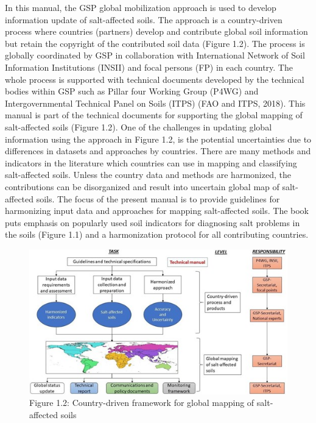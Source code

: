 \documentclass[
  10pt,
  b5paper,
]{book}
\begin{document}
In this manual, the GSP global mobilization approach is used to develop information update of salt-affected soils. The approach is a country-driven process where countries (partners) develop and contribute global soil information but retain the copyright of the contributed soil data (Figure 1.2). The process is globally coordinated by GSP in collaboration with International Network of Soil Information Institutions (INSII) and
focal persons (FP) in each country. The whole process is supported with technical documents developed by the technical bodies within GSP such as Pillar four Working Group (P4WG) and Intergovernmental Technical Panel on Soils (ITPS) (FAO and ITPS, 2018). This manual is part of the technical documents for supporting the global mapping of salt-affected soils (Figure 1.2).
One of the challenges in updating global information using the approach in Figure 1.2, is the potential uncertainties due to differences in datasets and approaches by countries. There are many methods and indicators in the literature which countries can use in mapping and classifying salt-affected soils. Unless the country data and methods are harmonized, the contributions can be disorganized and result into uncertain global map of salt-affected soils. The focus of the present manual is to provide guidelines for harmonizing input data and approaches for mapping salt-affected soils. The book puts emphasis on popularly used soil indicators for diagnosing salt problems in the soils (Figure 1.1) and a harmonization protocol for all contributing countries.

\begin{figure}
\centering
\includegraphics{figures/images/Figure1.2.jpg}
\caption{Figure 1.2: Country-driven framework for global mapping of salt-affected soils}
\end{figure}
\end{document}
